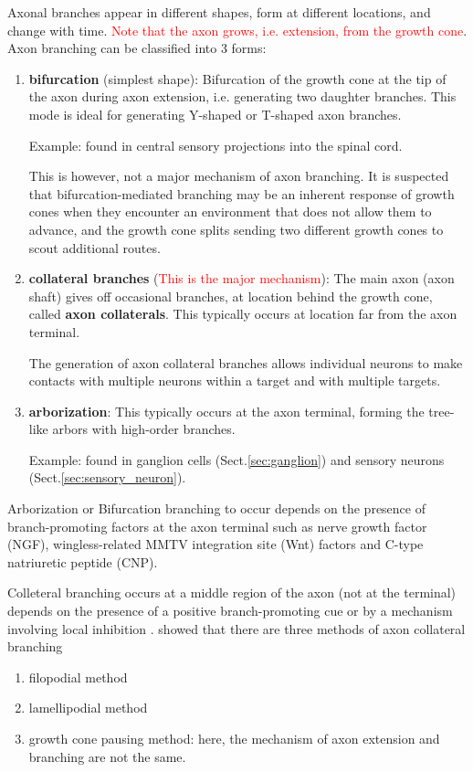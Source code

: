 Axonal branches appear in different shapes, form at different
locations, and change with time. 
\textcolor{red}{Note that the axon grows, i.e. extension, from the growth cone}.
Axon branching can be classified into 3 forms:
\citep{gibson2011}
\begin{enumerate}
  \item {\bf bifurcation} (simplest shape): Bifurcation of the growth
  cone at the tip of the axon during axon extension, i.e. generating
  two daughter branches. This mode is ideal for generating Y-shaped or T-shaped
  axon branches. 
  
  Example: found in central sensory projections into the spinal cord.
  
  This is however, not a major mechanism of axon branching.
  It is suspected that bifurcation-mediated branching may be an inherent
  response of growth cones when they encounter an environment
that does not allow them to advance, and the growth cone splits sending two
different growth cones to scout additional routes. \citep{gallo2011}

  \item {\bf collateral branches} (\textcolor{red}{This is the major
  mechanism}):
  The main axon (axon shaft) gives off occasional branches, at location behind the growth cone, called {\bf axon
  collaterals}.   This typically occurs at location far from the axon terminal.
  
The generation of axon collateral branches allows individual neurons to make
contacts with multiple neurons within a target and with multiple targets.
  
  \item {\bf arborization}: This typically occurs at
  the axon terminal, forming the tree-like arbors with high-order branches. 
  
  Example: found in ganglion cells (Sect.\ref{sec:ganglion})
  and sensory neurons (Sect.\ref{sec:sensory_neuron}). 

\end{enumerate}
Arborization or Bifurcation branching to occur depends on the presence of
branch-promoting factors at the axon terminal such as nerve growth factor (NGF),
wingless-related MMTV integration site (Wnt) factors and C-type natriuretic
peptide (CNP). 

Colleteral branching occurs at a middle region of the axon (not at the terminal)
depends on the presence of a positive branch-promoting cue or by a mechanism
involving local inhibition \citep{gibson2011}.
\citep{gallo2011} showed that there are three methods of axon collateral branching
\begin{enumerate}
  \item filopodial method
  
  \item lamellipodial method
  
  \item growth cone pausing method: 
  here, the mechanism of axon extension and branching are not the same.
\end{enumerate}

